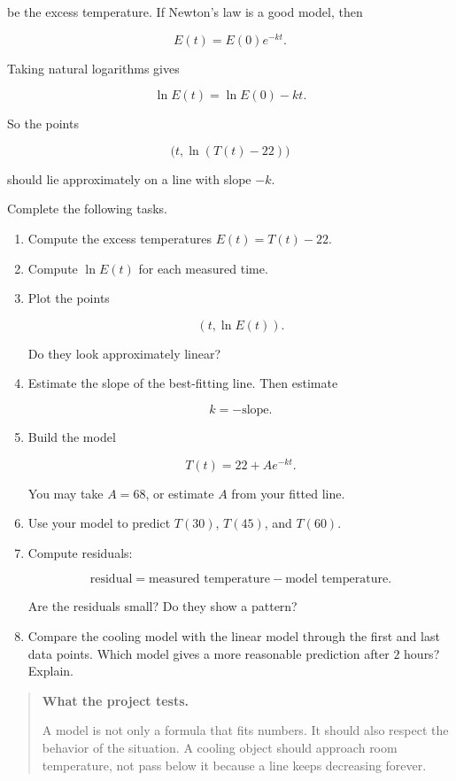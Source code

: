 be the excess temperature.  If Newton's law is a good model, then

\[
E(t)=E(0)e^{-kt}.
\]

Taking natural logarithms gives

\[
\ln E(t)=\ln E(0)-kt.
\]

So the points

\[
\bigl(t,\ln(T(t)-22)\bigr)
\]

should lie approximately on a line with slope \(-k\).

Complete the following tasks.

\begin{enumerate}
\item Compute the excess temperatures \(E(t)=T(t)-22\).

\item Compute \(\ln E(t)\) for each measured time.

\item Plot the points

\[
(t,\ln E(t)).
\]

Do they look approximately linear?

\item Estimate the slope of the best-fitting line.  Then estimate

\[
k=-\text{slope}.
\]

\item Build the model

\[
T(t)=22+Ae^{-kt}.
\]

You may take \(A=68\), or estimate \(A\) from your fitted line.

\item Use your model to predict \(T(30)\), \(T(45)\), and \(T(60)\).

\item Compute residuals:

\[
\text{residual}
=
\text{measured temperature}
-
\text{model temperature}.
\]

Are the residuals small?  Do they show a pattern?

\item Compare the cooling model with the linear model through the first and last
data points.  Which model gives a more reasonable prediction after \(2\) hours?
Explain.
\end{enumerate}

\begin{quote}
\textbf{What the project tests.}

A model is not only a formula that fits numbers.  It should also respect the behavior
of the situation.  A cooling object should approach room temperature, not pass below
it because a line keeps decreasing forever.
\end{quote}

